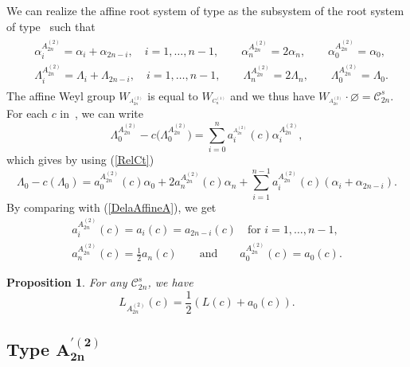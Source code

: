 \documentclass[pdftex]{sigma}
\newtheorem{Proposition}[Theorem]{Proposition}
 { \theoremstyle{definition}
\newtheorem{Definition}[Theorem]{Definition}
\newtheorem{Note}[Theorem]{Note}
\newtheorem{Example}[Theorem]{Example}
\newtheorem{Remark}[Theorem]{Remark} }
\numberwithin{equation}{section}
\begin{document}
We can realize the affine root system of type  as the
subsystem of the root system of type~ such that%
\begin{gather*} %
\begin{split}
& \alpha _{i}^{A_{2n}^{(2)}}=\alpha _{i}+\alpha _{2n-i},\quad i=1,\dots ,n-1 ,\qquad
\alpha _{n}^{A_{2n}^{(2)}}=2\alpha _{n} ,\qquad
\alpha _{0}^{A_{2n}^{(2)}}=\alpha _{0},\\
& \Lambda _{i}^{A_{2n}^{(2)}}=\Lambda _{i}+\Lambda _{2n-i},\quad i=1,\dots ,n-1, \qquad
\Lambda _{n}^{A_{2n}^{(2)}}=2\Lambda _{n}, \qquad
\Lambda _{0}^{A_{2n}^{(2)}}=\Lambda _{0}.
\end{split}
\end{gather*}
The affine Weyl group $W_{^{A_{2n}^{(2)}}}$ is equal to $W_{^{C_{n}^{(1)}}}$
and we thus have $W_{^{A_{2n}^{(2)}}}\cdot \varnothing =\mathcal{C}_{2n}^{s}$. For each $c$ in~, we can write
\begin{equation*}
\Lambda _{0}^{A_{2n}^{(2)}}-c\bigl(\Lambda
_{0}^{A_{2n}^{(2)}}\bigr)=\sum_{i=0}^{n}a_{i}^{_{A_{2n}^{(2)}}}(c)\alpha
_{i}^{A_{2n}^{(2)}},
\end{equation*}%
which gives by using (\ref{RelCt})%
\begin{equation*}
\Lambda _{0}-c(\Lambda _{0})=a_{0}^{A_{2n}^{(2)}}(c)\alpha
_{0}+2a_{n}^{A_{2n}^{(2)}}(c)\alpha
_{n}+\sum_{i=1}^{n-1}a_{i}^{A_{2n}^{(2)}}(c)(\alpha _{i}+\alpha _{2n-i})%
 .
\end{equation*}%
By comparing with (\ref{DelaAffineA}), we get%
\begin{gather*}
a_{i}^{A_{2n}^{(2)}}(c)=a_{i}(c)=a_{2n-i}(c)\quad \text{for }i=1,\dots ,n-1, \\
a_{n}^{A_{2n}^{(2)}}(c)=\frac{1}{2}a_{n}(c)\qquad \text{and}\qquad
a_{0}^{A_{2n}^{(2)}}(c)=a_{0}(c).
\end{gather*}

\begin{Proposition}
	\label{Prop_A(2n,2)}For any  $\mathcal{C}
	_{2n}^{s}$, we have
	\begin{equation*}
	L_{A_{2n}^{(2)}}(c)=\frac{1}{2}(L(c)+a_{0}(c)).
	\end{equation*}
\end{Proposition}

\subsection[Type A\_\{2n\}\^{}\{'(2)\}]{Type $\boldsymbol{A_{2n}^{\prime (2)}}$}
\end{document}
